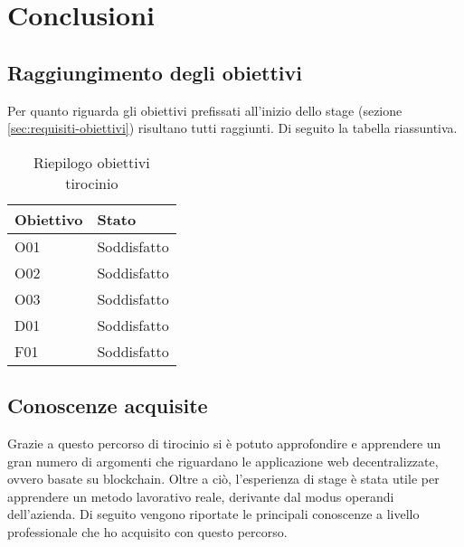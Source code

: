 
\chapter{Conclusioni}
\label{cap:conclusioni}

\section{Raggiungimento degli obiettivi}
Per quanto riguarda gli obiettivi prefissati all'inizio dello stage (sezione \ref{sec:requisiti-obiettivi}) risultano tutti raggiunti. Di seguito la tabella riassuntiva.

\begin{longtable}[c]{|p{3cm} p{3cm}|}
\caption{Riepilogo obiettivi tirocinio}
\label{tab:obiettivi-tirocinio}
\\ \hline
\rowcolor{gray!40}
\textbf{Obiettivo} &
\textbf{Stato} \\ \hline
\endhead

O01 & Soddisfatto \\ \hline

O02 & Soddisfatto \\ \hline

O03 & Soddisfatto \\ \hline

D01 & Soddisfatto \\ \hline

F01 & Soddisfatto \\ \hline

\end{longtable}

\section{Conoscenze acquisite}
Grazie a questo percorso di tirocinio si è potuto approfondire e apprendere un gran numero di argomenti che riguardano le applicazione web decentralizzate, ovvero basate su blockchain. Oltre a ciò, l'esperienza di stage è stata utile per apprendere un metodo lavorativo reale, derivante dal modus operandi dell'azienda. Di seguito vengono riportate le principali conoscenze a livello professionale che ho acquisito con questo percorso.

